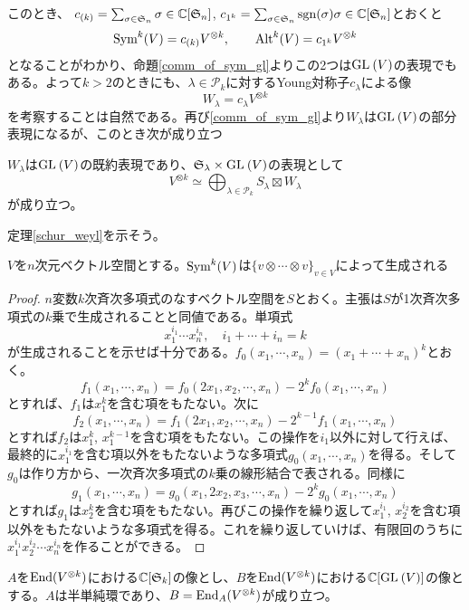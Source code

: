 \documentclass{ltjsreport}
\begin{document}
このとき、
$c_{(k)}=\sum_{\sigma\in \mathfrak{S}_n}\sigma\in\mathbb{C}[\mathfrak{S}_n]$, $c_{1^k}=\sum_{\sigma\in \mathfrak{S}_n}\mathrm{sgn}(\sigma)\sigma\in\mathbb{C}[\mathfrak{S}_n]$とおくと
\[
\text{Sym}^k(V)=c_{(k)}V^{\otimes k},\qquad\text{Alt}^k(V)=c_{1^k}V^{\otimes k}
\]
となることがわかり、命題\ref{comm_of_sym_gl}よりこの2つは$\text{GL}\:(V)$の表現でもある。よって$k>2$のときにも、$\lambda\in\mathcal{P}_k$に対するYoung対称子$c_\lambda$による像
\[
W_\lambda=c_\lambda V^{\otimes k}  
\]
を考察することは自然である。再び\ref{comm_of_sym_gl}より$W_\lambda$は$\text{GL}\:(V)$の部分表現になるが、このとき次が成り立つ

\begin{theo}\label{schur_weyl}
  $W_\lambda$は$\text{GL}\:(V)$の既約表現であり、$\mathfrak{S}_\lambda\times\text{GL}\:(V)$の表現として
  \[
  V^{\otimes k}\simeq \bigoplus_{\lambda\in\mathcal{P}_k}S_\lambda\boxtimes W_\lambda  
  \]
  が成り立つ。
\end{theo}

定理\ref{schur_weyl}を示そう。

\begin{lemm}\label{gen_of_symtensor}
  $V$を$n$次元ベクトル空間とする。$\text{Sym}^k(V)$は$\{v\otimes\cdots\otimes v\}_{v\in V}$によって生成される
\end{lemm}

\begin{proof}
  $n$変数$k$次斉次多項式のなすベクトル空間を$S$とおく。主張は$S$が1次斉次多項式の$k$乗で生成されることと同値である。単項式
  \[
  x_1^{i_1}\cdots x_n^{i_n},\quad i_1+\cdots+i_n=k
  \]
  が生成されることを示せば十分である。$f_0(x_1,\cdots,x_n)=(x_1+\cdots +x_n)^k$とおく。
  \[
  f_1(x_1,\cdots,x_n)=f_0(2x_1,x_2,\cdots,x_n)-2^{k}f_0(x_1,\cdots,x_n)  
  \]
  とすれば、$f_1$は$x_1^k$を含む項をもたない。次に
  \[
  f_2(x_1,\cdots,x_n)=f_1(2x_1,x_2,\cdots,x_n)-2^{k-1}f_1(x_1,\cdots,x_n)  
  \]
  とすれば$f_2$は$x_1^{k}$, $x_1^{k-1}$を含む項をもたない。この操作を$i_1$以外に対して行えば、最終的に$x_1^{i_1}$を含む項以外をもたないような多項式$g_0(x_1,\cdots,x_n)$を得る。そして$g_0$は作り方から、一次斉次多項式の$k$乗の線形結合で表される。同様に
  \[
  g_1(x_1,\cdots,x_n)=g_0(x_1,2x_2,x_3,\cdots,x_n)-2^{k}g_0(x_1,\cdots,x_n)  
  \]
  とすれば$g_1$は$x_2^k$を含む項をもたない。再びこの操作を繰り返して$x_1^{i_1}$, $x_2^{i_2}$を含む項以外をもたないような多項式を得る。これを繰り返していけば、有限回のうちに$x_1^{i_1}x_2^{i_2}\cdots x_n^{i_n}$を作ることができる。
\end{proof}


\begin{lemm}\label{lemma}
  $A$を$\text{End}(V^{\otimes k})$における$\mathbb{C}[\mathfrak{S}_k]$の像とし、$B$を$\text{End}(V^{\otimes k})$における$\mathbb{C}[\text{GL}\:(V)]$の像とする。$A$は半単純環であり、$B=\text{End}_A(V^{\otimes k})$が成り立つ。
\end{lemm}
\end{document}
